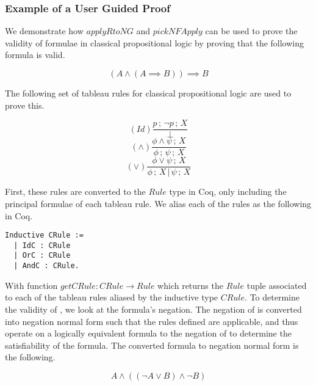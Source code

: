 \subsubsection{Example of a User Guided Proof}

We demonstrate how $applyRtoNG$ and $pickNFApply$ can be used to prove the
validity of formulae in classical propositional logic by proving that the
following formula is valid.

\begin{equation}
(A \wedge (A \implies B)) \implies B
\label{cpl example formula}
\end{equation}

The following set of tableau rules for classical propositional logic are used
to prove this.

\begin{multicols}{3}
\begin{equation*}
(Id)\frac{p\,;\,\neg p\,;\,X}{\bot}
\end{equation*}
\break
\begin{equation*}
(\wedge)\frac{\phi \wedge \psi\,;\,X}{\phi\,;\,\psi\,;\,X}
\end{equation*}
\break
\begin{equation*}
(\vee)\frac{\phi \vee \psi\,;\,X}{\phi\,;\,X\,|\,\psi\,;\,X}
\end{equation*}
\end{multicols}

First, these rules are converted to the $Rule$ type in Coq, only including
the principal formulae of each tableau rule. We alias each of the rules as the
following in Coq.

\begin{lstlisting}
Inductive CRule := 
  | IdC : CRule
  | OrC : CRule
  | AndC : CRule.
\end{lstlisting}

With function $getCRule : CRule \rightarrow Rule$ which returns the $Rule$
tuple associated to each of the tableau rules aliased by the inductive type
$CRule$. To determine the validity of , we look at
the formula's negation. The negation of  is converted
into negation normal form such that the rules defined are applicable, and thus
operate on a logically equivalent formula to the negation of  to determine the satisfiability of the formula. The converted
formula to negation normal form is the following.

\begin{equation}
A \wedge ((\neg A \vee B) \wedge \neg B)
\label{cpl example nnf}
\end{equation}

